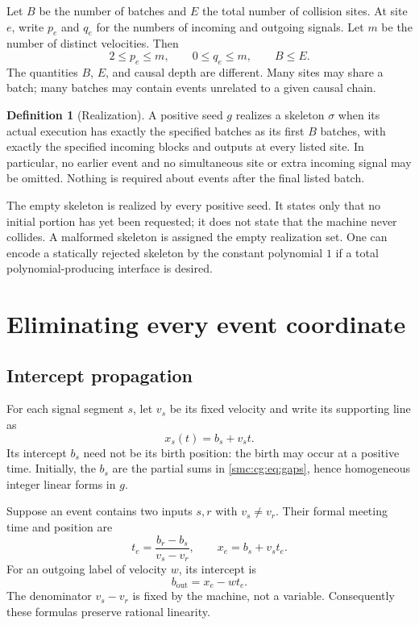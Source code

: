 \documentclass[11pt,letterpaper]{article}
\numberwithin{equation}{section}
\theoremstyle{definition}
\newtheorem{definition}[theorem]{Definition}
\theoremstyle{remark}
\begin{document}
Let $B$ be the number of batches and $E$ the total number of collision sites.
At site $e$, write $p_e$ and $q_e$ for the numbers of incoming and outgoing
signals. Let $m$ be the number of distinct velocities. Then
\begin{equation}
 2\le p_e\le m,\qquad 0\le q_e\le m,\qquad B\le E.
 \label{smc:cg:eq:arity}
\end{equation}
The quantities $B$, $E$, and causal depth are different. Many sites may share
a batch; many batches may contain events unrelated to a given causal chain.

\begin{definition}[Realization]
A positive seed $g$ realizes a skeleton $\sigma$ when its actual execution
has exactly the specified batches as its first $B$ batches, with exactly the
specified incoming blocks and outputs at every listed site. In particular,
no earlier event and no simultaneous site or extra incoming signal may be
omitted. Nothing is required about events after the final listed batch.
\end{definition}

The empty skeleton is realized by every positive seed. It states only that
no initial portion has yet been requested; it does not state that the
machine never collides. A malformed skeleton is assigned the empty
realization set. One can encode a statically rejected skeleton by the
constant polynomial $1$ if a total polynomial-producing interface is desired.

\section{Eliminating every event coordinate}
\label{smc:cg:sec:linear}

\subsection{Intercept propagation}

For each signal segment $s$, let $v_s$ be its fixed velocity and write its
supporting line as
\begin{equation}
 x_s(t)=b_s+v_st.
 \label{smc:cg:eq:line}
\end{equation}
Its intercept $b_s$ need not be its birth position: the birth may occur at a
positive time. Initially, the $b_s$ are the partial sums in
\eqref{smc:cg:eq:gaps}, hence homogeneous integer linear forms in $g$.

Suppose an event contains two inputs $s,r$ with $v_s\ne v_r$. Their formal
meeting time and position are
\begin{equation}
 t_e=\frac{b_r-b_s}{v_s-v_r},\qquad
 x_e=b_s+v_st_e.
 \label{smc:cg:eq:meet}
\end{equation}
For an outgoing label of velocity $w$, its intercept is
\begin{equation}
 b_{\mathrm{out}}=x_e-wt_e.
 \label{smc:cg:eq:out}
\end{equation}
The denominator $v_s-v_r$ is fixed by the machine, not a variable.
Consequently these formulas preserve rational linearity.
\end{document}
